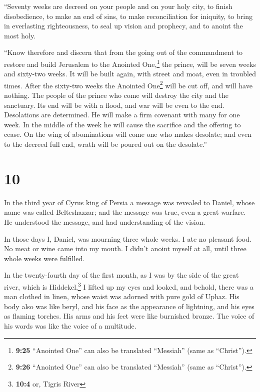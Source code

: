  ``Seventy weeks are decreed on your people and on your
holy city, to finish disobedience, to make an end of sins, to make
reconciliation for iniquity, to bring in everlasting righteousness, to
seal up vision and prophecy, and to anoint the most holy.

 ``Know therefore and discern that from the going out of
the commandment to restore and build Jerusalem to the Anointed
One,\footnote{\textbf{9:25} ``Anointed One'' can also be translated
  ``Messiah'' (same as ``Christ'').} the prince, will be seven weeks and
sixty-two weeks. It will be built again, with street and moat, even in
troubled times.  After the sixty-two weeks the Anointed
One\footnote{\textbf{9:26} ``Anointed One'' can also be translated
  ``Messiah'' (same as ``Christ'').} will be cut off, and will have
nothing. The people of the prince who come will destroy the city and the
sanctuary. Its end will be with a flood, and war will be even to the
end. Desolations are determined.  He will make a firm
covenant with many for one week. In the middle of the week he will cause
the sacrifice and the offering to cease. On the wing of abominations
will come one who makes desolate; and even to the decreed full end,
wrath will be poured out on the desolate.''

\hypertarget{section-9}{%
\section{10}\label{section-9}}

 In the third year of Cyrus king of Persia a message was
revealed to Daniel, whose name was called Belteshazzar; and the message
was true, even a great warfare. He understood the message, and had
understanding of the vision.

 In those days I, Daniel, was mourning three whole weeks.
 I ate no pleasant food. No meat or wine came into my
mouth. I didn't anoint myself at all, until three whole weeks were
fulfilled.

 In the twenty-fourth day of the first month, as I was by
the side of the great river, which is Hiddekel,\footnote{\textbf{10:4}
  or, Tigris River}  I lifted up my eyes and looked, and
behold, there was a man clothed in linen, whose waist was adorned with
pure gold of Uphaz.  His body also was like beryl, and his
face as the appearance of lightning, and his eyes as flaming torches.
His arms and his feet were like burnished bronze. The voice of his words
was like the voice of a multitude.

